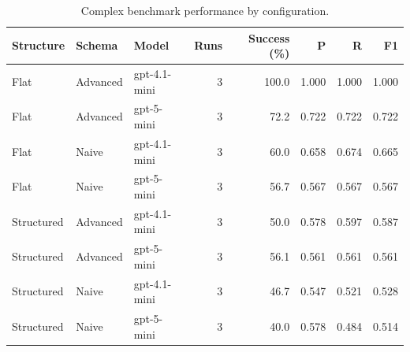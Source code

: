 \begin{table}[htbp]
\centering
\small
\caption{Complex benchmark performance by configuration.}
\label{tab:complex-config-comparison}
\begin{tabular}{lllrrrrr}
\toprule
Structure & Schema & Model & Runs & Success (\%) & P & R & F1 \\
\midrule
Flat & Advanced & gpt-4.1-mini & 3 & 100.0 & 1.000 & 1.000 & 1.000 \\
Flat & Advanced & gpt-5-mini & 3 & 72.2 & 0.722 & 0.722 & 0.722 \\
Flat & Naive & gpt-4.1-mini & 3 & 60.0 & 0.658 & 0.674 & 0.665 \\
Flat & Naive & gpt-5-mini & 3 & 56.7 & 0.567 & 0.567 & 0.567 \\
Structured & Advanced & gpt-4.1-mini & 3 & 50.0 & 0.578 & 0.597 & 0.587 \\
Structured & Advanced & gpt-5-mini & 3 & 56.1 & 0.561 & 0.561 & 0.561 \\
Structured & Naive & gpt-4.1-mini & 3 & 46.7 & 0.547 & 0.521 & 0.528 \\
Structured & Naive & gpt-5-mini & 3 & 40.0 & 0.578 & 0.484 & 0.514 \\
\bottomrule
\end{tabular}
\end{table}
